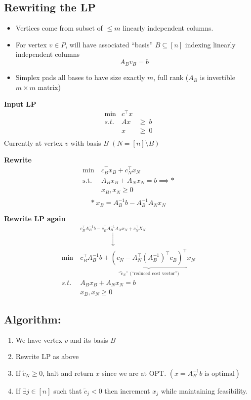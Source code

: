 \documentclass[11pt]{article}
\begin{document}
\subsection{Rewriting the LP}
\begin{itemize}
\item Vertices come from subset of $\leq m$ linearly independent columns.
\item For vertex $v \in P$, will have associated ``basis'' $B \subseteq [n]$
  indexing linearly independent columns
  \[A_B v_B = b\]
\item Simplex pads all bases to have size exactly $m$, full rank
  ($A_B$ is invertible $m \times m$ matrix)
\end{itemize}

\textbf{Input LP}
\begin{eqnarray*}
\min & c^\top x  \\
s.t. & Ax & \geq~b \\
 & x & \geq~0  \\
\end{eqnarray*}
Currently at vertex $v$ with basis $B$ $(N = [n] \setminus B)$

\textbf{Rewrite}
\begin{align*}
\min~&c_B^\top x_B + c_N^\top x_N \\
\text{s.t. }& \boxed{A_B x_B + A_N x_N = b} \implies *\\
& x_B, x_N \geq 0\\
\end{align*}
\[*~\boxed{x_B = A_B^{-1} b - A_B^{-1} A_N x_N} \]

\textbf{Rewrite LP again}
\begin{align*}
&\stackrel{\boxed{c_B^\top A_B^{-1} b - c_B^\top A_B^{-1} A_N x_N + c_N^\top X_N}}{\downarrow} \\
\min~&c_B^\top A_B^{-1} b + \underbrace{(c_N - A_N^\top(A_B^{-1})^\top c_B)^\top}_{\mbox{``$\tilde c_N$'' (``reduced cost vector'')}} x_N \\
  s.t.~& A_B x_B + A_N x_N = b \\
&x_B, x_N \geq 0
\end{align*}

\subsection{Algorithm:}
\begin{enumerate}
\item We have vertex $v$ and its basis $B$
\item Rewrite LP as above
\item If $\tilde c_N \geq 0$, halt and return $x$ since we are at OPT. $(x = A^{-1}_B b \text{ is optimal})$
\item If $\exists j \in [n]$ such that $\tilde c_j < 0$ then increment $x_j$
  while maintaining feasibility.
\end{enumerate}
\end{document}
